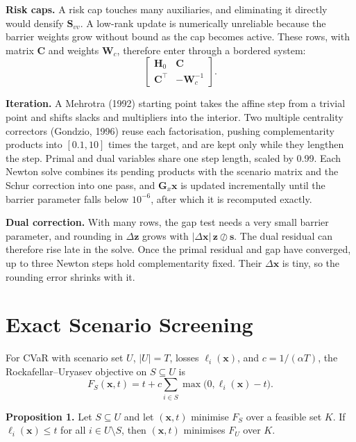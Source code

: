 \documentclass[10pt,twocolumn,letterpaper]{article}
\begin{document}
\textbf{Risk caps.} A risk cap touches many auxiliaries, and eliminating it directly would densify $\mathbf{S}_{vv}$. A low-rank update is numerically unreliable because the barrier weights grow without bound as the cap becomes active. These rows, with matrix $\mathbf{C}$ and weights $\mathbf{W}_c$, therefore enter through a bordered system:
\begin{equation}
\begin{bmatrix} \mathbf{H}_0 & \mathbf{C} \\ \mathbf{C}^\top & -\mathbf{W}_c^{-1} \end{bmatrix}. \label{eq:bordered}
\end{equation}

\textbf{Iteration.} A Mehrotra (1992) starting point takes the affine step from a trivial point and shifts slacks and multipliers into the interior. Two multiple centrality correctors (Gondzio, 1996) reuse each factorisation, pushing complementarity products into $[0.1, 10]$ times the target, and are kept only while they lengthen the step. Primal and dual variables share one step length, scaled by 0.99. Each Newton solve combines its pending products with the scenario matrix and the Schur correction into one pass, and $\mathbf{G}_x\mathbf{x}$ is updated incrementally until the barrier parameter falls below $10^{-6}$, after which it is recomputed exactly.

\textbf{Dual correction.} With many rows, the gap test needs a very small barrier parameter, and rounding in $\Delta\mathbf{z}$ grows with $|\Delta\mathbf{x}|\,\mathbf{z} \oslash \mathbf{s}$. The dual residual can therefore rise late in the solve. Once the primal residual and gap have converged, up to three Newton steps hold complementarity fixed. Their $\Delta\mathbf{x}$ is tiny, so the rounding error shrinks with it.

\section{Exact Scenario Screening}

For CVaR with scenario set $U$, $|U| = T$, losses $\ell_i(\mathbf{x})$, and $c = 1/(\alpha T)$, the Rockafellar--Uryasev objective on $S \subseteq U$ is
\begin{equation}
F_S(\mathbf{x}, t) = t + c \sum_{i \in S} \max\big(0, \ell_i(\mathbf{x}) - t\big). \label{eq:ru}
\end{equation}

\textbf{Proposition 1.} Let $S \subseteq U$ and let $(\mathbf{x}, t)$ minimise $F_S$ over a feasible set $K$. If $\ell_i(\mathbf{x}) \le t$ for all $i \in U \setminus S$, then $(\mathbf{x}, t)$ minimises $F_U$ over $K$.
\end{document}
